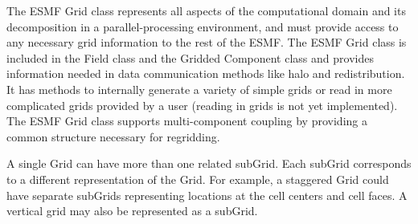 %


The ESMF Grid class represents all aspects of the computational domain and its
decomposition in a parallel-processing environment, and must provide access to
any necessary grid information to the rest of the ESMF.  The ESMF Grid class
is included in the Field class and the Gridded Component class
and provides information needed in data communication methods like halo and
redistribution.  It has methods to internally generate a variety of
simple grids or read in more complicated grids provided by a user 
(reading in grids is not yet implemented).  The
ESMF Grid class supports multi-component coupling by providing a common
structure necessary for regridding.

A single Grid can have more than one related subGrid.  Each subGrid corresponds
to a different representation of the Grid.  For example, a staggered Grid could
have separate subGrids representing locations at the cell centers and cell 
faces.  A vertical grid may also be represented as a subGrid.

